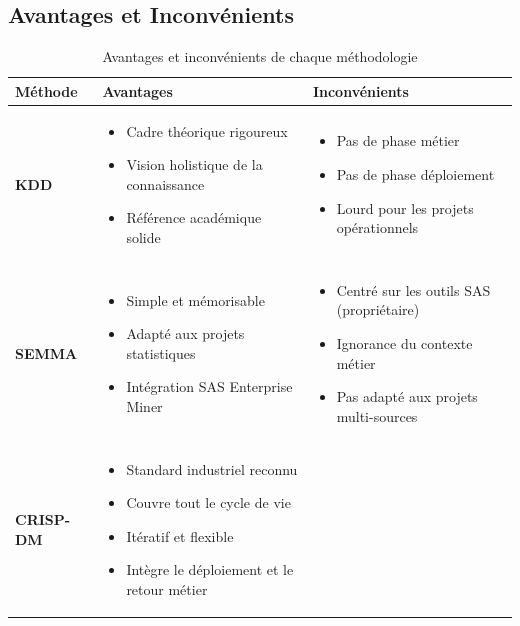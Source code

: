 \documentclass[12pt, a4paper]{report}
\begin{document}
\subsection{Avantages et Inconvénients}

\begin{table}[H]
\centering
\caption{Avantages et inconvénients de chaque méthodologie}
\label{tab:avantages_inconvenients}
\begin{tabularx}{\textwidth}{l X X}
\toprule
\textbf{Méthode} & \textbf{Avantages} & \textbf{Inconvénients} \\
\midrule
\textbf{KDD} &
\begin{itemize}[leftmargin=*,topsep=0pt]
    \item Cadre théorique rigoureux
    \item Vision holistique de la connaissance
    \item Référence académique solide
\end{itemize}
&
\begin{itemize}[leftmargin=*,topsep=0pt]
    \item Pas de phase métier
    \item Pas de phase déploiement
    \item Lourd pour les projets opérationnels
\end{itemize}
\\
\midrule
\textbf{SEMMA} &
\begin{itemize}[leftmargin=*,topsep=0pt]
    \item Simple et mémorisable
    \item Adapté aux projets statistiques
    \item Intégration SAS Enterprise Miner
\end{itemize}
&
\begin{itemize}[leftmargin=*,topsep=0pt]
    \item Centré sur les outils SAS (propriétaire)
    \item Ignorance du contexte métier
    \item Pas adapté aux projets multi-sources
\end{itemize}
\\
\midrule
\textbf{CRISP-DM} &
\begin{itemize}[leftmargin=*,topsep=0pt]
    \item Standard industriel reconnu
    \item Couvre tout le cycle de vie
    \item Itératif et flexible
    \item Intègre le déploiement et le retour métier

\end{itemize}
\end{tabularx}
\end{table}
\end{document}
